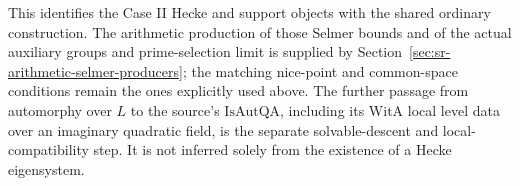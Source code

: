 This identifies the Case II Hecke and support
objects with the shared ordinary construction.
The arithmetic production of those Selmer bounds and
of the actual auxiliary groups and prime-selection limit is supplied
by Section~\ref{sec:sr-arithmetic-selmer-producers}; the matching nice-point
and common-space conditions remain the ones explicitly used above.
The further passage from automorphy over \(L\)
to the source's \(\mathrm{IsAutQA}\), including
its \(\mathrm{WitA}\) local level data over an
imaginary quadratic field, is the separate
solvable-descent and local-compatibility step.
It is not inferred solely from the existence
of a Hecke eigensystem.

